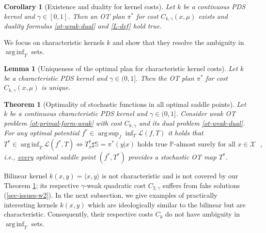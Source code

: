 \documentclass{article} %
\DeclareMathOperator*{\argsup}{arg\,sup}
\DeclareMathOperator*{\arginf}{arg\,inf}
\newtheorem{theorem}{Theorem}
\newtheorem{lemma}{Lemma}
\newtheorem{corollary}{Corollary}
\begin{document}
\begin{corollary}[Existence and duality for kernel costs]
Let $k$ be a continuous PDS kernel and $\gamma\in [0,1]$. Then an OT plan $\pi^{*}$ for cost $C_{k,\gamma}(x,\mu)$ exists and duality formulas \eqref{ot-weak-dual} and \eqref{L-def} hold true.
\vspace{-2mm}
\end{corollary}
We focus on characteristic kernels $k$ and show that they resolve the ambiguity in $\arginf_{T}$ sets.

\begin{lemma}[Uniqueness of the optimal plan for characteristic kernel costs] Let $k$ be a characteristic PDS kernel and $\gamma\in (0,1]$. Then the OT plan $\pi^{*}$ for cost $C_{k,\gamma}(x,\mu)$ is unique.
\label{lemma-unique-plan}
\end{lemma}

\begin{theorem}[Optimality of stochastic functions in all optimal saddle points]Let $k$ be a continuous characteristic PDS kernel and $\gamma\in (0,1]$. Consider weak OT problem \eqref{ot-primal-form-weak} with cost $C_{k,\gamma}$ and its dual problem \eqref{ot-weak-dual}.
For any optimal potential $f^{*}\in\argsup_{f}\inf_{T}\mathcal{L}(f,T)$ it holds that
\begin{equation}T^{*}\!\in\! \arginf\nolimits_{T}\mathcal{L}(f^{*},T)\Longleftrightarrow 
T^{*}_{x}\sharp\mathbb{S}=\pi^{*}(y|x)\mbox{ holds true }\mathbb{P}\mbox{-almost surely for all }x\in\mathcal{X}\mbox{ },
\end{equation}
i.e., \underline{every} optimal saddle point $(f^{*},T^{*})$ provides a stochastic OT map $T^{*}$.
\label{thm-resolved-kernel}
\vspace{-1mm}
\end{theorem}
Bilinear kernel $k(x,y)=\langle x,y\rangle$ is not characteristic and is not covered by our Theorem \ref{thm-resolved-kernel}; its respective $\gamma$-weak quadratic cost $C_{2,\gamma}$ suffers from fake solutions (\wasyparagraph\ref{sec-issues-w2}). In the next subsection, we give examples of practically interesting kernels $k(x,y)$ which are ideologically similar to the bilinear but are characteristic. Consequently, their respective costs $C_{k}$ do not have ambiguity in $\arginf_{T}$ sets.
\end{document}
